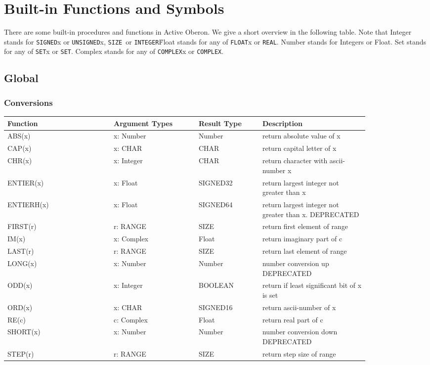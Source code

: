 \documentclass[a4wide,11pt]{article}
\newcommand{\INTEGER}{\lstinline"INTEGER"}
\newcommand{\SIGNED}{\lstinline"SIGNED"}
\newcommand{\UNSIGNED}{\lstinline"UNSIGNED"}
\newcommand{\REAL}{\lstinline"REAL"}
\newcommand{\COMPLEX}{\lstinline"COMPLEX"}
\newcommand{\FLOAT}{\lstinline"FLOAT"}
\newcommand{\SET}{\lstinline"SET"}
\newcommand{\SIZE}{\lstinline"SIZE"}
\begin{document}
\section{Built-in Functions and Symbols}
There are some built-in procedures and functions in Active Oberon.
We give a short overview in the following table.
Note that Integer stands for \SIGNED{x} or \UNSIGNED{x}, \SIZE\ or \INTEGER\.
Float stands for any of \FLOAT{x} or \REAL.
Number stands for Integers or Float.
Set stands for any of \SET{x} or \SET.
Complex stands for any of \COMPLEX{x} or \COMPLEX.
\subsection{Global}
\subsubsection{Conversions}
\begin{longtable}{|p{0.25\linewidth}|p{0.2\linewidth}|p{0.15\linewidth}|p{0.25\linewidth}|}
\hline
Function & Argument Types & Result Type & Description \\
\hline\hline
\endhead
ABS(x) & x: Number & Number & return absolute value of x\\
CAP(x) & x: CHAR & CHAR & return capital letter of x\\
CHR(x) & x: Integer & CHAR & return character with ascii-number x\\
ENTIER(x) & x: Float & SIGNED32 & return largest integer not greater than x\\
ENTIERH(x) & x: Float & SIGNED64 & return largest integer not greater than x. DEPRECATED\\
FIRST(r) & r: RANGE & SIZE & return first element of range \\
IM(x) & x: Complex & Float & return imaginary part of c \\
LAST(r) & r: RANGE & SIZE & return last element of range \\
LONG(x) & x: Number & Number & number conversion up DEPRECATED \\
ODD(x) & x: Integer & BOOLEAN & return if least significant bit of x is set\\
ORD(x) & x: CHAR & SIGNED16 & return ascii-number of x\\
RE(c) & c: Complex & Float & return real part of c \\
SHORT(x) & x: Number & Number & number conversion down DEPRECATED \\
STEP(r) & r: RANGE & SIZE & return step size of range \\
\hline
\end{longtable}
\end{document}
